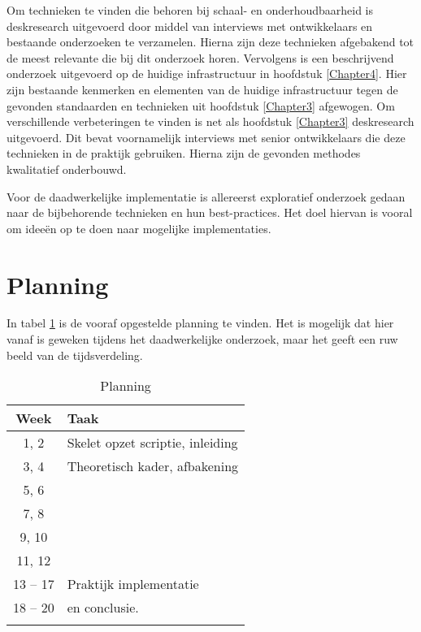 Om technieken te vinden die behoren bij schaal- en onderhoudbaarheid is deskresearch uitgevoerd door middel van interviews met ontwikkelaars en bestaande onderzoeken te verzamelen. Hierna zijn deze technieken afgebakend tot de meest relevante die bij dit onderzoek horen. Vervolgens is een beschrijvend onderzoek uitgevoerd op de huidige infrastructuur in hoofdstuk \ref{Chapter4}. Hier zijn bestaande kenmerken en elementen van de huidige infrastructuur tegen de gevonden standaarden en technieken uit hoofdstuk \ref{Chapter3} afgewogen. Om verschillende verbeteringen te vinden is net als hoofdstuk \ref{Chapter3} deskresearch uitgevoerd. Dit bevat voornamelijk interviews met senior ontwikkelaars die deze technieken in de praktijk gebruiken. Hierna zijn de gevonden methodes kwalitatief onderbouwd.

Voor de daadwerkelijke implementatie is allereerst exploratief onderzoek gedaan naar de bijbehorende technieken en hun best-practices. Het doel hiervan is vooral om ideeën op te doen naar mogelijke implementaties.

\section{Planning}
In tabel \ref{tab:planning} is de vooraf opgestelde planning te vinden. Het is mogelijk dat hier vanaf is geweken tijdens het daadwerkelijke onderzoek, maar het geeft een ruw beeld van de tijdsverdeling.

\begin{table}[h]
	\caption{Planning}
	\label{tab:planning}
	\centering
	\begin{tabular}{c p{12cm}}
		\toprule
		\textbf{Week} & \textbf{Taak}\\
		\midrule
			1, 2 & Skelet opzet scriptie, inleiding \\
			3, 4 & Theoretisch kader, afbakening \\
			5, 6 & \deeltechnieken \\
			7, 8 & \deelhuidig \\
			9, 10 & \deelverbetering \\
			11, 12 & \deelimplementatie \\
			13 -- 17 & Praktijk implementatie \\
			18 -- 20 & \deelrequirements en conclusie.\\
		\bottomrule\\
	\end{tabular}
\end{table}


